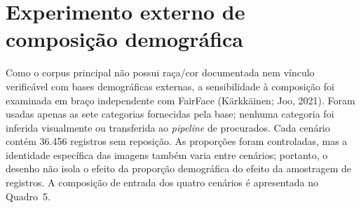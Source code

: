 
\section{Experimento externo de composição demográfica}

Como o corpus principal não possui raça/cor documentada nem vínculo verificável com bases demográficas externas, a sensibilidade à composição foi examinada em braço independente com FairFace (Kärkkäinen; Joo, 2021). Foram usadas apenas as sete categorias fornecidas pela base; nenhuma categoria foi inferida visualmente ou transferida ao \emph{pipeline} de procurados. Cada cenário contém 36.456 registros sem reposição. As proporções foram controladas, mas a identidade específica das imagens também varia entre cenários; portanto, o desenho não isola o efeito da proporção demográfica do efeito da amostragem de registros. A composição de entrada dos quatro cenários é apresentada no Quadro~5.


